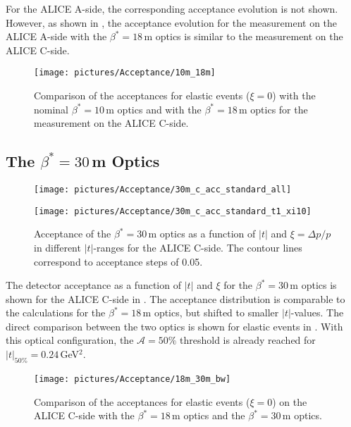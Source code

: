 For the ALICE A-side, the corresponding acceptance evolution is not shown. However, as shown in , the acceptance evolution for the measurement on the ALICE A-side with the $\beta^*=18\,$m optics is similar to the measurement on the ALICE C-side. 
 
%
\begin{figure}[t]
  \centering
  \texttt{[image: pictures/Acceptance/10m\_18m]}
  \caption{Comparison of the acceptances for elastic events ($\xi=0$) with the nominal $\beta^*=10\,$m optics and with the $\beta^*=18\,$m optics for the measurement on the ALICE C-side.}
  \label{fig:10_18_comparison} 
\end{figure}
%
\newpage
\subsection{The $\beta^*=30\,$m Optics}
\vspace{-0.7cm}
\begin{figure}[h]
\begin{minipage}[t]{.5\textwidth}
  \texttt{[image: pictures/Acceptance/30m\_c\_acc\_standard\_all]}
\end{minipage}
\hfill
\begin{minipage}[t]{0.5\textwidth}
\centering
\texttt{[image: pictures/Acceptance/30m\_c\_acc\_standard\_t1\_xi10]}
\end{minipage}
\caption{Acceptance of the $\beta^*=$30$\,$m optics as a function of $|t|$ and $\xi=\Delta p/p$ in different $|t|$-ranges for the ALICE C-side. The contour lines correspond to acceptance steps of 0.05.}
\label{fig:30m_acc_ac}
\end{figure}
The detector acceptance as a function of $|t|$ and $\xi$ for the $\beta^*=$30$\,$m optics is shown for the ALICE C-side in . The acceptance distribution is comparable to the calculations for the $\beta^*=18\,$m optics, but shifted to smaller $|t|$-values. The direct comparison between the two optics is shown for elastic events in . With this optical configuration, the $\mathcal{A}=50\%$ threshold is already reached for $|t|_{50\%}=0.24\,$GeV$^2$.
\vspace{-0.3cm}
\begin{figure}[h]
  \centering
  \texttt{[image: pictures/Acceptance/18m\_30m\_bw]}
  \caption{Comparison of the acceptances for elastic events ($\xi=0$) on the ALICE C-side with the $\beta^*=18\,$m optics and the $\beta^*=30\,$m optics.}
  \label{fig:18_30_comparison} 
\end{figure}

